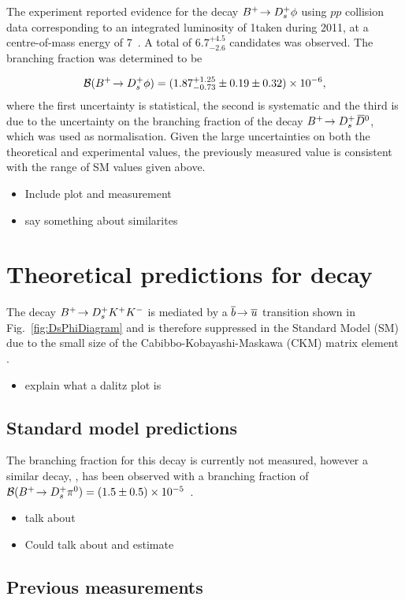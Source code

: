 {\color{Blue}
The \lhcb experiment reported evidence for the decay ${{{B}^+}}\!\rightarrow {\ensuremath{{D}^+_{s}}}\phi$ using $pp$ collision data corresponding to an integrated luminosity of 1\invfb taken during 2011, at a centre-of-mass energy of 7\tev~\cite{Aaij:2012zh}. A total of $6.7^{+4.5}_{-2.6}$ candidates was observed. The branching fraction was determined to be 

\begin{equation}
\mathcal{B}({{{B}^+}}\!\rightarrow {\ensuremath{{D}^+_{s}}}\phi) = (1.87^{+1.25}_{-0.73} \pm 0.19 \pm 0.32) \times 10^{-6},
\end{equation}
where the first uncertainty is statistical, the second is systematic and the third is due to the uncertainty on the branching fraction of the decay ${{{B}^+}}\!\rightarrow {\ensuremath{{D}^+_{s}}}{\ensuremath{{\kern 0.2em\overline{\kern -0.2em D}{}}{}^0}}$, which was used as normalisation. 
Given the large uncertainties on both the theoretical and experimental values, the previously measured value is consistent with the range of SM values given above.
}

{\color{Red}
\begin{itemize}
\item Include plot and measurement
\item say something about similarites 
\end{itemize}}


\section{Theoretical predictions for \decay{\Bp}{\Dsp\Kp\Km} decay}



{\color{Blue}
The decay ${{{B}^+}}\!\rightarrow {\ensuremath{{D}^+_{s}}}{\ensuremath{{K}^+}}{\ensuremath{{K}^-}}$ is mediated by a ${\overline {{b}}}\!\rightarrow {\ensuremath{\overline {{u}}}}$ transition shown in Fig.~\ref{fig:DsPhiDiagram} and is therefore suppressed in the Standard Model (SM) due to the small size of the Cabibbo-Kobayashi-Maskawa (CKM) matrix element \Vub. 
}


{\color{Red}
\begin{itemize}
\item explain what a dalitz plot is
\end{itemize}
}

\subsection{Standard model predictions}
{\color{Blue}
The branching fraction for this decay is currently not measured, however a similar decay, \decay{\Bp}{\Dsp \piz}, has been observed with a branching fraction of $\mathcal{B}({{{B}^+}}\!\rightarrow {\ensuremath{{D}^+_{s}}} {\ensuremath{{\pi}^0}}) = (1.5 \pm 0.5) \times 10^{-5}$~\cite{Aubert:2006xy}.
}


{\color{Red}
\begin{itemize}
\item talk about \decay{\Bp}{\Dsp\piz}
\item Could talk about \decay{\Bp}{\Dp\Kp\pim} and estimate   
\end{itemize}}

\subsection{Previous measurements}



